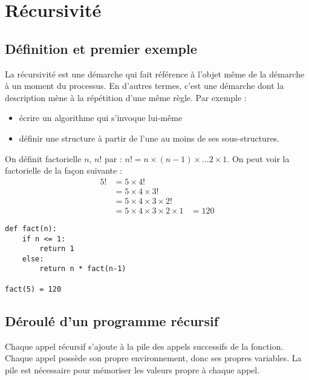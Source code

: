 \documentclass[12pt,fleqn]{book} %
\date{}
\begin{document}
	
\setcounter{chapter}{1}
\chapter{Récursivité}
\section{Définition et premier exemple}
\begin{definition}
La récursivité est une démarche qui fait référence à l'objet même de la démarche à un moment du processus. En d'autres termes, c'est une démarche dont la description mène à la répétition d'une même règle. Par exemple : 
\begin{itemize}
	\item écrire un algorithme qui s'invoque lui-même
	\item définir une structure à partir de l'une au moins de ses sous-structures.
\end{itemize}
\end{definition}
	
	
\begin{example}
On définit factorielle $n$, $n!$ par : $n! = n \times (n-1) \times \dots 2 \times 1$.
On peut voir la factorielle de la façon suivante :
\begin{align*}
5! & = 5 \times 4! \\
& = 5 \times 4 \times 3! \\
& = 5 \times 4 \times 3 \times 2! \\
& = 5 \times 4 \times 3 \times 2 \times 1	
& = 120
\end{align*}
\end{example}



\begin{center}
	\begin{varwidth}[t]{.5\textwidth}
		\begin{lstlisting}[language=iPython,linewidth = 12cm]
def fact(n):
	if n <= 1:
		return 1
	else:
		return n * fact(n-1)

fact(5) = 120\end{lstlisting}
\end{varwidth}\end{center}

\section{Déroulé d'un programme récursif}

Chaque appel récursif s'ajoute à la pile des appels successifs de la fonction. Chaque appel possède son propre environnement, donc ses propres variables. La pile est nécessaire pour mémoriser les valeurs propre à chaque appel.
\end{document}
